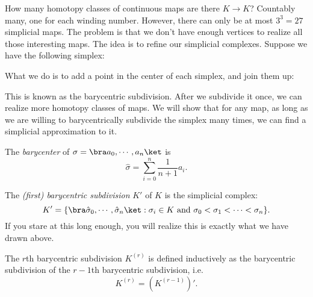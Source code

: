 \documentclass[a4paper]{article}
\begin{document}
How many homotopy classes of continuous maps are there $K \to K$? Countably many, one for each winding number. However, there can only be at most $3^3 = 27$ simplicial maps. The problem is that we don't have enough vertices to realize all those interesting maps. The idea is to refine our simplicial complexes. Suppose we have the following simplex:
\begin{center}
\end{center}
What we do is to add a point in the center of each simplex, and join them up:
\begin{center}
\end{center}
This is known as the barycentric subdivision. After we subdivide it once, we can realize more homotopy classes of maps. We will show that for any map, as long as we are willing to barycentrically subdivide the simplex many times, we can find a simplicial approximation to it.

\begin{defi}[Barycenter]
  The \emph{barycenter} of $\sigma = \bra a_0, \cdots, a_n\ket$ is
  \[
    \hat{\sigma} = \sum_{i = 0}^n \frac{1}{n + 1} a_i.
  \]
\end{defi}

\begin{defi}
  The \emph{(first) barycentric subdivision} $K'$ of $K$ is the simplicial complex:
  \[
    K' = \{\bra \hat{\sigma}_0, \cdots, \hat{\sigma}_n\ket: \sigma_i \in K\text{ and }\sigma_0 < \sigma_1 < \cdots < \sigma_n\}.
  \]
  If you stare at this long enough, you will realize this is exactly what we have drawn above.

  The $r$th barycentric subdivision $K^{(r)}$ is defined inductively as the barycentric subdivision of the $r - 1$th barycentric subdivision, i.e.
  \[
    K^{(r)} = (K^{(r - 1)})'.
  \]
\end{defi}
\end{document}
